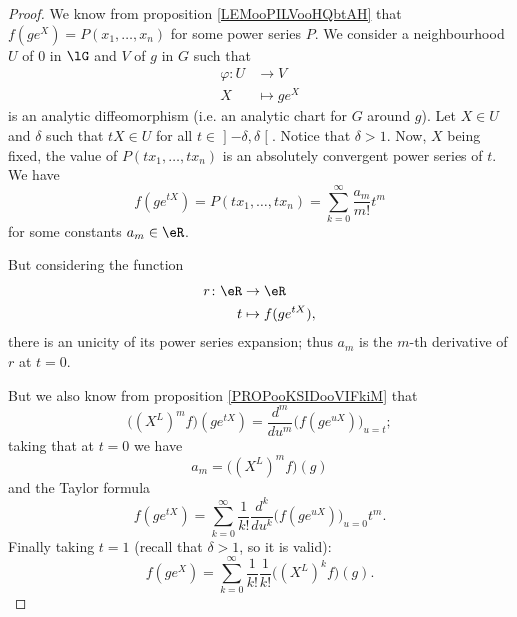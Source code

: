 \begin{proof}
    We know from proposition \ref{LEMooPILVooHQbtAH} that \( f(g e^{X})=P(x_1,\ldots, x_n)\) for some power series \( P\). We consider a neighbourhood \( U\) of \( 0\) in \( \lG\) and \( V\) of \( g\) in \( G\) such that
    \begin{equation}
        \begin{aligned}
            \varphi\colon U&\to V \\
            X&\mapsto  ge^{X} 
        \end{aligned}
    \end{equation}
is an analytic diffeomorphism (i.e. an analytic chart for \( G\) around \( g\)). Let \( X\in U\) and \( \delta\) such that \( tX\in U\) for all \( t\in \mathopen] -\delta , \delta \mathclose[\). Notice that \( \delta>1\). Now, \( X\) being fixed, the value of \( P(tx_1,\ldots, tx_n)\) is an absolutely convergent power series of \( t\). We have
    \begin{equation}
        f(g e^{tX})=P(tx_1,\ldots, tx_n)=\sum_{k=0}^{\infty}\frac{ a_m }{ m! }t^m
    \end{equation}
    for some constants \( a_m\in \eR\).

    But considering the function
    \begin{equation}
        \begin{aligned}
            r\colon \eR&\to \eR \\
            t&\mapsto f(g e^{tX}), 
        \end{aligned}
    \end{equation}
    there is an unicity of its power series expansion; thus \( a_m\) is the \( m\)-th derivative of \( r\) at \( t=0\).

    But we also know from proposition \ref{PROPooKSIDooVIFkiM} that
    \begin{equation}
        \big( (X^L)^mf \big)(g e^{tX})=\frac{ d^m }{ du^m }\big( f(g e^{uX}) \big)_{u=t};
    \end{equation}
    taking that at \( t=0\) we have
    \begin{equation}
        a_m=\big( (X^L)^mf \big)(g)
    \end{equation}
    and the Taylor formula
    \begin{equation}
        f(g e^{tX})=\sum_{k=0}^{\infty}\frac{1}{ k! }\frac{ d^k }{ du^k }\big( f(g e^{uX}) \big)_{u=0}t^m.
    \end{equation}
    Finally taking \( t=1\) (recall that \( \delta>1\), so it is valid):
    \begin{equation}
        f(g e^{X})=\sum_{k=0}^{\infty}\frac{1}{ k! }\frac{1}{ k! }\big( (X^L)^kf \big)(g).
    \end{equation}
\end{proof}

